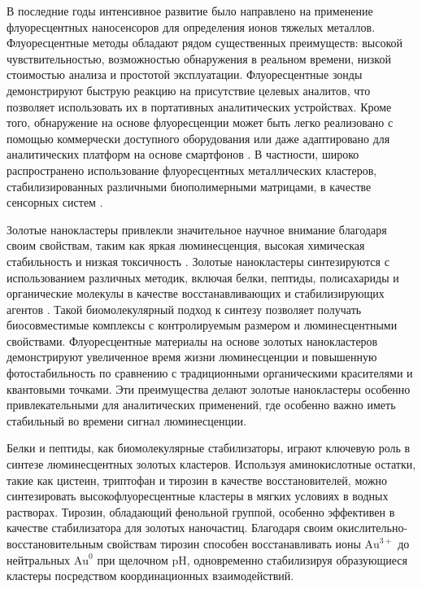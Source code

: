 \documentclass[a4paper, 12pt]{article}
\begin{document}
\begin{onehalfspace}
	В последние годы интенсивное развитие было направлено на применение флуоресцентных наносенсоров для определения ионов тяжелых металлов.
	Флуоресцентные методы обладают рядом существенных преимуществ: высокой чувствительностью, возможностью обнаружения в реальном времени, низкой стоимостью анализа и простотой эксплуатации.
	Флуоресцентные зонды демонстрируют быструю реакцию на присутствие целевых аналитов, что позволяет использовать их в портативных аналитических устройствах.
	Кроме того, обнаружение на основе флуоресценции может быть легко реализовано с помощью коммерчески доступного оборудования или даже адаптировано для аналитических платформ на основе смартфонов \cite{Yang:2014}.
	В частности, широко распространено использование флуоресцентных металлических кластеров, стабилизированных различными биополимерными матрицами, в качестве сенсорных систем \cite{Song:2016,Ding:2021}.

	Золотые нанокластеры привлекли значительное научное внимание благодаря своим свойствам, таким как яркая люминесценция, высокая химическая стабильность и низкая токсичность \cite{Chakraborty:2017}.
	Золотые нанокластеры синтезируются с использованием различных методик, включая белки, пептиды, полисахариды и органические молекулы в качестве восстанавливающих и стабилизирующих агентов \cite{Ding:2021, Kawasaki:2011, Baksi:2013, Xavier:2010, Xie:2009}.
	Такой биомолекулярный подход к синтезу позволяет получать биосовместимые комплексы с контролируемым размером и люминесцентными свойствами.
	Флуоресцентные материалы на основе золотых нанокластеров демонстрируют увеличенное время жизни люминесценции и повышенную фотостабильность по сравнению с традиционными органическими красителями и квантовыми точками.
	Эти преимущества делают золотые нанокластеры особенно привлекательными для аналитических применений, где особенно важно иметь стабильный во времени сигнал люминесценции.

	Белки и пептиды, как биомолекулярные стабилизаторы, играют ключевую роль в синтезе люминесцентных золотых кластеров.
	Используя аминокислотные остатки, такие как цистеин, триптофан и тирозин в качестве восстановителей, можно синтезировать высокофлуоресцентные кластеры в мягких условиях в водных растворах.
	Тирозин, обладающий фенольной группой, особенно эффективен в качестве стабилизатора для золотых наночастиц.
	Благодаря своим окислительно-восстановительным свойствам тирозин способен восстанавливать ионы $\text{Au}^{3+}$ до нейтральных $\text{Au}^0$ при щелочном pH, одновременно стабилизируя образующиеся кластеры посредством координационных взаимодействий.


\end{onehalfspace}
\end{document}
